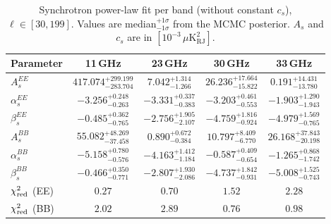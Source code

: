 \begin{table}[htbp]
\centering
\caption{Synchrotron power-law fit per band (without constant $c_s$), $\ell \in [30, 199]$. Values are median$^{+1\sigma}_{-1\sigma}$ from the MCMC posterior. $A_s$ and $c_s$ are in $[10^{-3}\,\mu\mathrm{K}^2_\mathrm{RJ}]$.}
\label{tab:sync_single_band_noc_ell30-199}
\begin{tabular}{lcccc}
\toprule
Parameter & 11\,GHz & 23\,GHz & 30\,GHz & 33\,GHz \\
\midrule
$A_s^{EE}$ & $417.074^{+299.199}_{-283.704}$ & $7.042^{+1.314}_{-1.266}$ & $26.236^{+17.664}_{-15.822}$ & $0.191^{+14.431}_{-13.780}$ \\
$\alpha_s^{EE}$ & $-3.256^{+0.248}_{-0.263}$ & $-3.331^{+0.337}_{-0.383}$ & $-3.203^{+0.461}_{-0.553}$ & $-1.903^{+1.290}_{-1.943}$ \\
$\beta_s^{EE}$ & $-0.485^{+0.362}_{-0.765}$ & $-2.756^{+1.905}_{-2.107}$ & $-4.759^{+1.816}_{-0.924}$ & $-4.979^{+1.569}_{-0.765}$ \\
\midrule
$A_s^{BB}$ & $55.082^{+48.269}_{-37.458}$ & $0.890^{+0.672}_{-0.384}$ & $10.797^{+8.409}_{-6.770}$ & $26.168^{+37.843}_{-20.198}$ \\
$\alpha_s^{BB}$ & $-5.158^{+0.780}_{-0.576}$ & $-4.163^{+1.412}_{-1.184}$ & $-0.587^{+0.409}_{-0.654}$ & $-1.265^{+0.868}_{-1.742}$ \\
$\beta_s^{BB}$ & $-0.466^{+0.350}_{-0.771}$ & $-2.807^{+1.930}_{-2.086}$ & $-4.737^{+1.842}_{-0.931}$ & $-5.008^{+1.525}_{-0.743}$ \\
\midrule
$\chi^2_{\rm red}$ (EE) & $0.27$ & $0.70$ & $1.52$ & $2.28$ \\
$\chi^2_{\rm red}$ (BB) & $2.02$ & $2.89$ & $0.76$ & $0.98$ \\
\bottomrule
\end{tabular}
\end{table}